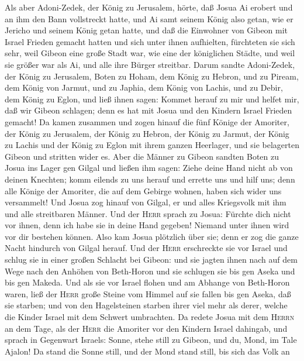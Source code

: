  Als aber Adoni-Zedek, der König zu Jerusalem, hörte, daß
Josua Ai erobert und an ihm den Bann vollstreckt hatte, und Ai samt
seinem König also getan, wie er Jericho und seinem König getan hatte,
und daß die Einwohner von Gibeon mit Israel Frieden gemacht hatten und
sich unter ihnen aufhielten, fürchteten sie sich sehr, 
weil Gibeon eine große Stadt war, wie eine der königlichen Städte, und
weil sie größer war als Ai, und alle ihre Bürger streitbar.
 Darum sandte Adoni-Zedek, der König zu Jerusalem, Boten
zu Hoham, dem König zu Hebron, und zu Piream, dem König von Jarmut, und
zu Japhia, dem König von Lachis, und zu Debir, dem König zu Eglon, und
ließ ihnen sagen:  Kommet herauf zu mir und helfet mir,
daß wir Gibeon schlagen; denn es hat mit Josua und den Kindern Israel
Frieden gemacht!  Da kamen zusammen und zogen hinauf die
fünf Könige der Amoriter, der König zu Jerusalem, der König zu Hebron,
der König zu Jarmut, der König zu Lachis und der König zu Eglon mit
ihrem ganzen Heerlager, und sie belagerten Gibeon und stritten wider es.
 Aber die Männer zu Gibeon sandten Boten zu Josua ins
Lager gen Gilgal und ließen ihm sagen: Ziehe deine Hand nicht ab von
deinen Knechten; komm eilends zu uns herauf und errette uns und hilf
uns; denn alle Könige der Amoriter, die auf dem Gebirge wohnen, haben
sich wider uns versammelt!  Und Josua zog hinauf von
Gilgal, er und alles Kriegsvolk mit ihm und alle streitbaren Männer.
 Und der \textsc{Herr} sprach zu Josua: Fürchte dich nicht
vor ihnen, denn ich habe sie in deine Hand gegeben! Niemand unter ihnen
wird vor dir bestehen können.  Also kam Josua plötzlich
über sie; denn er zog die ganze Nacht hindurch von Gilgal herauf.
 Und der \textsc{Herr} erschreckte sie vor Israel und
schlug sie in einer großen Schlacht bei Gibeon: und sie jagten ihnen
nach auf dem Wege nach den Anhöhen von Beth-Horon und sie schlugen sie
bis gen Aseka und bis gen Makeda.  Und als sie vor Israel
flohen und am Abhange von Beth-Horon waren, ließ der \textsc{Herr} große
Steine vom Himmel auf sie fallen bis gen Aseka, daß sie starben; und von
den Hagelsteinen starben ihrer viel mehr als derer, welche die Kinder
Israel mit dem Schwert umbrachten.  Da redete Josua mit
dem \textsc{Herrn} an dem Tage, als der \textsc{Herr} die Amoriter vor
den Kindern Israel dahingab, und sprach in Gegenwart Israels: Sonne,
stehe still zu Gibeon, und du, Mond, im Tale Ajalon!  Da
stand die Sonne still, und der Mond stand still, bis sich das Volk an
